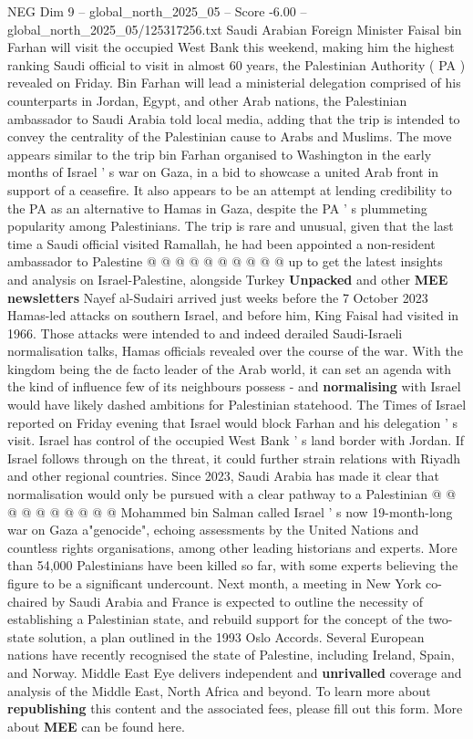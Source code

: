 \begin{textsample}{NEG Dim 9 – global\_north\_2025\_05 – Score -6.00 – global\_north\_2025\_05/125317256.txt}  \label{ex:f9_neg_091}
Saudi Arabian Foreign Minister Faisal bin Farhan will visit the occupied West Bank this weekend, making him the highest ranking Saudi official to visit in almost 60 years, the Palestinian Authority ( PA ) revealed on Friday.
Bin Farhan will lead a ministerial delegation comprised of his counterparts in Jordan, Egypt, and other Arab nations, the Palestinian ambassador to Saudi Arabia told local media, adding that the trip is intended to convey the centrality of the Palestinian cause to Arabs and Muslims.
The move appears similar to the trip bin Farhan organised to Washington in the early months of Israel ' s war on Gaza, in a bid to showcase a united Arab front in support of a ceasefire.
It also appears to be an attempt at lending credibility to the PA as an alternative to Hamas in Gaza, despite the PA ' s plummeting popularity among Palestinians.
The trip is rare and unusual, given that the last time a Saudi official visited Ramallah, he had been appointed a non-resident ambassador to Palestine @ @ @ @ @ @ @ @ @ @ up to get the latest insights and analysis on Israel-Palestine, alongside Turkey \textbf{Unpacked} and other \textbf{MEE} \textbf{newsletters} Nayef al-Sudairi arrived just weeks before the 7 October 2023 Hamas-led attacks on southern Israel, and before him, King Faisal had visited in 1966.
Those attacks were intended to and indeed derailed Saudi-Israeli normalisation talks, Hamas officials revealed over the course of the war.
With the kingdom being the de facto leader of the Arab world, it can set an agenda with the kind of influence few of its neighbours possess - and \textbf{normalising} with Israel would have likely dashed ambitions for Palestinian statehood.
The Times of Israel reported on Friday evening that Israel would block Farhan and his delegation ' s visit.
Israel has control of the occupied West Bank ' s land border with Jordan.
If Israel follows through on the threat, it could further strain relations with Riyadh and other regional countries.
Since 2023, Saudi Arabia has made it clear that normalisation would only be pursued with a clear pathway to a Palestinian @ @ @ @ @ @ @ @ @ @ Mohammed bin Salman called Israel ' s now 19-month-long war on Gaza a"genocide", echoing assessments by the United Nations and countless rights organisations, among other leading historians and experts.
More than 54,000 Palestinians have been killed so far, with some experts believing the figure to be a significant undercount.
Next month, a meeting in New York co-chaired by Saudi Arabia and France is expected to outline the necessity of establishing a Palestinian state, and rebuild support for the concept of the two-state solution, a plan outlined in the 1993 Oslo Accords.
Several European nations have recently recognised the state of Palestine, including Ireland, Spain, and Norway.
Middle East Eye delivers independent and \textbf{unrivalled} coverage and analysis of the Middle East, North Africa and beyond.
To learn more about \textbf{republishing} this content and the associated fees, please fill out this form.
More about \textbf{MEE} can be found here.

\end{textsample}
